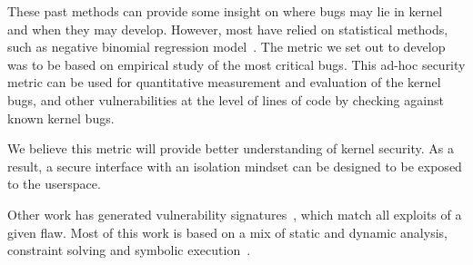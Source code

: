 These past methods can provide some insight on where bugs may lie in kernel and when
they may develop. However, most have relied on statistical methods, such as
negative binomial regression model~\cite{Bug-Location}. The metric we set out to
develop was to be based on empirical study of
the most critical bugs. This ad-hoc security metric can be used for
quantitative measurement and evaluation of the kernel bugs,
and other vulnerabilities at the level of lines of code by checking against
known kernel bugs.

We believe this metric will provide better understanding of kernel security.
As a result, a secure interface with an isolation mindset can be designed
to be exposed to the userspace.







Other work has generated vulnerability
signatures~\cite{brumley2006towards}, which match all exploits
of a given flaw. Most of this work is based on a mix of static and
dynamic analysis, constraint solving and symbolic execution~\cite{chou2003static}.


